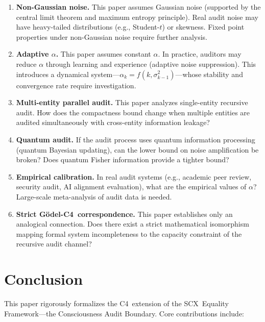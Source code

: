 \documentclass[12pt,a4paper]{article}
\theoremstyle{definition}
\newcommand{\SCX}{\textsf{SCX}}
\newcommand{\Cfour}{\textsc{C4}}
\begin{document}
\begin{enumerate}[leftmargin=*, label=\textbf{OP\arabic*}]
    \item \textbf{Non-Gaussian noise.} This paper assumes Gaussian noise (supported by the central limit theorem and maximum entropy principle). Real audit noise may have heavy-tailed distributions (e.g., Student-$t$) or skewness. Fixed point properties under non-Gaussian noise require further analysis.

    \item \textbf{Adaptive $\alpha$.} This paper assumes constant $\alpha$. In practice, auditors may reduce $\alpha$ through learning and experience (adaptive noise suppression). This introduces a dynamical system---$\alpha_k = f(k, \sigma_{k-1}^2)$---whose stability and convergence rate require investigation.

    \item \textbf{Multi-entity parallel audit.} This paper analyzes single-entity recursive audit. How does the compactness bound change when multiple entities are audited simultaneously with cross-entity information leakage?

    \item \textbf{Quantum audit.} If the audit process uses quantum information processing (quantum Bayesian updating), can the lower bound on noise amplification be broken? Does quantum Fisher information provide a tighter bound?

    \item \textbf{Empirical calibration.} In real audit systems (e.g., academic peer review, security audit, AI alignment evaluation), what are the empirical values of $\alpha$? Large-scale meta-analysis of audit data is needed.

    \item \textbf{Strict G\"{o}del-\Cfour\ correspondence.} This paper establishes only an analogical connection. Does there exist a strict mathematical isomorphism mapping formal system incompleteness to the capacity constraint of the recursive audit channel?
\end{enumerate}

\section{Conclusion}

\noindent
This paper rigorously formalizes the \Cfour\ extension of the \SCX\ Equality Framework---the Consciousness Audit Boundary. Core contributions include:
\end{document}
